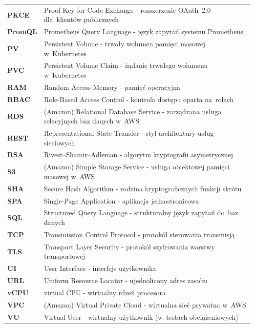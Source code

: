 \begin{longtable}{@{}>{\bfseries}l@{\hspace{1.5em}}p{}@{}}
PKCE    & Proof Key for Code Exchange - rozszerzenie OAuth~2.0 dla~klientów publicznych \\
PromQL  & Prometheus Query Language - język zapytań systemu Prometheus \\
PV      & Persistent Volume - trwały wolumen pamięci masowej w~Kubernetes \\
PVC     & Persistent Volume Claim - żądanie trwałego wolumenu w~Kubernetes \\
RAM     & Random Access Memory - pamięć operacyjna \\
RBAC    & Role-Based Access Control - kontrola dostępu oparta na~rolach \\
RDS     & (Amazon) Relational Database Service - zarządzana usługa relacyjnych baz danych w~AWS \\
REST    & Representational State Transfer - styl architektury usług sieciowych \\
RSA     & Rivest--Shamir--Adleman - algorytm kryptografii asymetrycznej \\
S3      & (Amazon) Simple Storage Service - usługa obiektowej pamięci masowej w~AWS \\
SHA     & Secure Hash Algorithm - rodzina kryptograficznych funkcji skrótu \\
SPA     & Single-Page Application - aplikacja jednostronicowa \\
SQL     & Structured Query Language - strukturalny język zapytań do~baz danych \\
TCP     & Transmission Control Protocol - protokół sterowania transmisją \\
TLS     & Transport Layer Security - protokół szyfrowania warstwy transportowej \\
UI      & User Interface - interfejs użytkownika \\
URL     & Uniform Resource Locator - ujednolicony adres zasobu \\
vCPU    & virtual CPU - wirtualny rdzeń procesora \\
VPC     & (Amazon) Virtual Private Cloud - wirtualna sieć prywatna w~AWS \\
VU      & Virtual User - wirtualny użytkownik (w~testach obciążeniowych) \\
\end{longtable}

\endgroup
